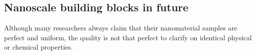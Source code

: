 





\subsection{Nanoscale building blocks in future}
Although many researchers always claim that their nanomaterial samples are perfect and uniform, the quality is not that perfect to clarify on identical physical or chemical properties.\\

